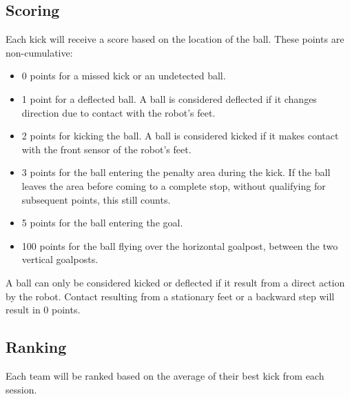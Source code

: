 \subsection{Scoring}

Each kick will receive a score based on the location of the ball.
These points are non-cumulative: 

\begin{itemize}
	\item 0 points for a missed kick or an undetected ball.
	\item 1 point for a deflected ball.
	A ball is considered deflected if it changes direction due to contact with the robot's feet.
	\item 2 points for kicking the ball.
	A ball is considered kicked if it makes contact with the front sensor of the robot's feet.
	\item 3 points for the ball entering the penalty area during the kick. 
	If the ball leaves the area before coming to a complete stop, without qualifying for subsequent points, this still counts. 
	\item 5 points for the ball entering the goal. 
	\item 100 points for the ball flying over the horizontal goalpost, between the two vertical goalposts. 
  \end{itemize}

  A ball can only be considered kicked or deflected if it result from a direct action by the robot.
  Contact resulting from a stationary feet or a backward step will result in 0 points.

  \subsection{Ranking}

  Each team will be ranked based on the average of their best kick from each session.